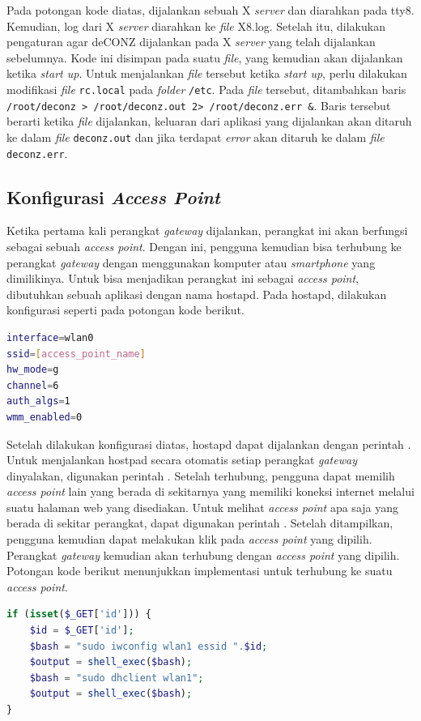 Pada potongan kode diatas, dijalankan sebuah X \textit{server} dan diarahkan pada tty8. Kemudian, log dari X \textit{server} diarahkan ke \textit{file} X8.log. Setelah itu, dilakukan pengaturan agar deCONZ dijalankan pada X \textit{server} yang telah dijalankan sebelumnya. Kode ini disimpan pada suatu \textit{file}, yang kemudian akan dijalankan ketika \textit{start up}. Untuk menjalankan \textit{file} tersebut ketika \textit{start up}, perlu dilakukan modifikasi \textit{file} \texttt{rc.local} pada \textit{folder} \texttt{/etc}. Pada \textit{file} tersebut, ditambahkan baris \texttt{/root/deconz > /root/deconz.out 2> /root/deconz.err \&}. Baris tersebut berarti ketika \textit{file} dijalankan, keluaran dari aplikasi yang dijalankan akan ditaruh ke dalam \textit{file} \texttt{deconz.out} dan jika terdapat \textit{error} akan ditaruh ke dalam \textit{file} \texttt{deconz.err}.

\subsection{Konfigurasi \textit{Access Point}}
Ketika pertama kali perangkat \textit{gateway} dijalankan, perangkat ini akan berfungsi sebagai sebuah \textit{access point}. Dengan ini, pengguna kemudian bisa terhubung ke perangkat \textit{gateway} dengan menggunakan komputer atau \textit{smartphone} yang dimilikinya. Untuk bisa menjadikan perangkat ini sebagai \textit{access point}, dibutuhkan sebuah aplikasi dengan nama hostapd. Pada hostapd, dilakukan konfigurasi seperti pada potongan kode berikut.

\begin{lstlisting}[language=bash,caption=Konfigurasi hostapd]
interface=wlan0
ssid=[access_point_name]
hw_mode=g
channel=6
auth_algs=1
wmm_enabled=0
\end{lstlisting}

Setelah dilakukan konfigurasi diatas, hostapd dapat dijalankan dengan perintah . Untuk menjalankan hostpad secara otomatis setiap perangkat \textit{gateway} dinyalakan, digunakan perintah . Setelah terhubung, pengguna dapat memilih \textit{access point} lain yang berada di sekitarnya yang memiliki koneksi internet melalui suatu halaman web yang disediakan. Untuk melihat \textit{access point} apa saja yang berada di sekitar perangkat, dapat digunakan perintah . Setelah ditampilkan, pengguna kemudian dapat melakukan klik pada \textit{access point} yang dipilih. Perangkat \textit{gateway} kemudian akan terhubung dengan \textit{access point} yang dipilih. Potongan kode berikut menunjukkan implementasi untuk terhubung ke suatu \textit{access point}.

\begin{lstlisting}[language=php,caption=Kode untuk terhubung ke suatu \textit{access point}]
if (isset($_GET['id'])) {
	$id = $_GET['id'];
	$bash = "sudo iwconfig wlan1 essid ".$id;
	$output = shell_exec($bash);
	$bash = "sudo dhclient wlan1";
	$output = shell_exec($bash);
}
\end{lstlisting}
